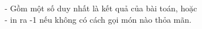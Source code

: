 - Gồm một số duy nhất là kết quả của bài toán, hoặc   
\\   - in ra -1 nếu không có cách gọi món nào thỏa mãn.